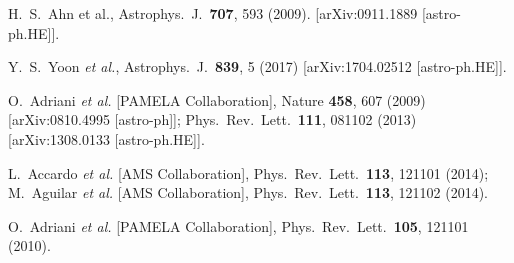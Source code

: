 \documentclass[prd,aps,twocolumn]{revtex4}
\begin{document}
\begin{thebibliography}{99}
  H.~S.~Ahn et al.,
  Astrophys.\ J.\  {\bf 707}, 593 (2009).
 [arXiv:0911.1889 [astro-ph.HE]].

Y.~S.~Yoon {\it et al.},
  Astrophys.\ J.\  {\bf 839}, 5 (2017)
  [arXiv:1704.02512 [astro-ph.HE]].



  O.~Adriani {\it et al.} [PAMELA Collaboration],
  Nature {\bf 458}, 607 (2009)
  [arXiv:0810.4995 [astro-ph]];
  Phys.\ Rev.\ Lett.\  {\bf 111}, 081102 (2013)
  [arXiv:1308.0133 [astro-ph.HE]].


  L.~Accardo {\it et al.} [AMS Collaboration],
  Phys.\ Rev.\ Lett.\  {\bf 113}, 121101 (2014);
  M.~Aguilar {\it et al.} [AMS Collaboration],
  Phys.\ Rev.\ Lett.\  {\bf 113}, 121102 (2014).


  
  O.~Adriani {\it et al.}  [PAMELA Collaboration],
  Phys.\ Rev.\ Lett.\  {\bf 105}, 121101 (2010).



\end{thebibliography}
\end{document}
